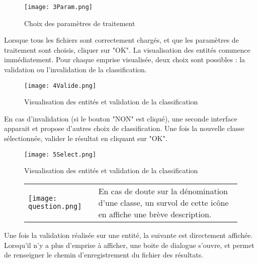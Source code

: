 \begin{figure}[H]
	\centering
	\texttt{[image: 3Param.png]} 
	\caption[Choix des paramètres de traitement]{Choix des paramètres de traitement}
	\label{fig:paramtraitement}
\end{figure}

Lorsque tous les fichiers sont correctement chargés, et que les paramètres de traitement sont choisis, cliquer sur "OK". La visualisation des entités commence immédiatement. Pour chaque emprise visualisée, deux choix sont possibles : la validation ou l'invalidation de la classification. \\

\begin{figure}[H]
	\centering
	\texttt{[image: 4Valide.png]} 
	\caption[Visualisation des entités et validation de la classification]{Visualisation des entités et validation de la classification}
	\label{fig:valide}
\end{figure}

En cas d'invalidation (si le bouton "NON" est cliqué), une seconde interface apparait et propose d'autres choix de classification. Une fois la nouvelle classe sélectionnée, valider le résultat en cliquant sur "OK".

\begin{figure}[H]
	\centering
	\texttt{[image: 5Select.png]} 
	\caption[Visualisation des entités et validation de la classification]{Visualisation des entités et validation de la classification}
	\label{fig:valide}
\end{figure}

\begin{figure}[H]
	\begin{center}
		\begin{tabular}{m{} m{}}
			\texttt{[image: question.png]} & En cas de doute sur la dénomination d'une classe, un survol de cette icône en affiche une brève description. \\
		\end{tabular}
	\end{center}
\end{figure}

Une fois la validation réalisée sur une entité, la suivante est directement affichée. Lorsqu'il n'y a plus d'emprise à afficher, une boite de dialogue s'ouvre, et permet de renseigner le chemin d'enregistrement du fichier des résultats.\\

